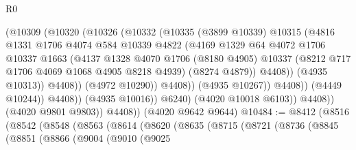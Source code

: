 \begin{lexlean}{R0}
\begin{coremodule}
                                  (@10309
                                    (@10320
                                      (@10326
                                        (@10332
                                          (@10335
                                            (@3899 @10339)
                                            @10315
                                            (@4816
                                              @1331
                                              @1706
                                              @4074
                                              @584
                                              @10339
                                              @4822
                                              (@4169
                                                @1329
                                                @64
                                                @4072
                                                @1706
                                                @10337
                                                @1663
                                                (@4137
                                                  @1328
                                                  @4070
                                                  @1706
                                                  (@8180 @4905)
                                                  @10337
                                                  (@8212 @717 @1706 @4069 @1068 @4905 @8218 @4939)
                                                  (@8274 @4879))
                                                @4408))
                                            (@4935 @10313))
                                          @4408))
                                      (@4972 @10290))
                                    @4408))
                                (@4935 @10267))
                              @4408))
                          (@4449 @10244))
                        @4408))
                    (@4935 @10016))
                  @6240)
                (@4020 @10018 @6103))
              @4408))
          (@4020 @9801 @9803))
        @4408))
    (@4020 @9642 @9644)
@10484 := @8412
    (@8516
      (@8542
        (@8548
          (@8563
            (@8614
              (@8620
                (@8635
                  (@8715
                    (@8721
                      (@8736
                        (@8845
                          (@8851
                            (@8866
                              (@9004
                                (@9010
                                  (@9025

\end{coremodule}
\end{lexlean}
